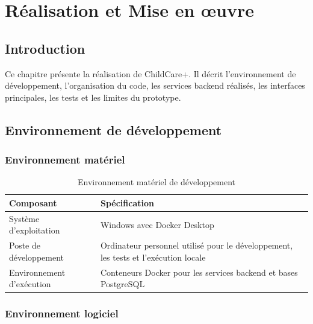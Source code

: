 \chapter{Réalisation et Mise en œuvre}
\label{chap:realisation}

\section*{Introduction}
Ce chapitre présente la réalisation de ChildCare+. Il décrit l'environnement de développement, l'organisation du code, les services backend réalisés, les interfaces principales, les tests et les limites du prototype.

\section{Environnement de développement}
\label{sec:environnement}

\subsection{Environnement matériel}

\begin{table}[htbp]
\centering
\caption{Environnement matériel de développement}
\label{tab:env-materiel}
\begin{tabularx}{\textwidth}{|l|X|}
\hline
\textbf{Composant} & \textbf{Spécification} \\
\hline
Système d'exploitation & Windows avec Docker Desktop \\
\hline
Poste de développement & Ordinateur personnel utilisé pour le développement, les tests et l'exécution locale \\
\hline
Environnement d'exécution & Conteneurs Docker pour les services backend et bases PostgreSQL \\
\hline
\end{tabularx}
\end{table}

\subsection{Environnement logiciel}

